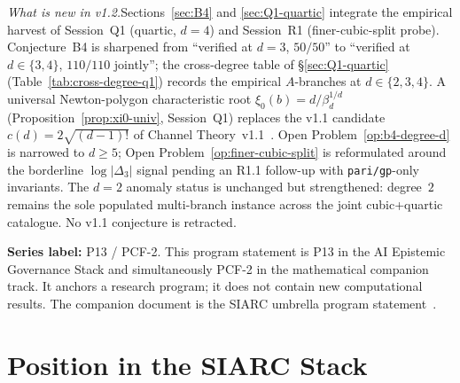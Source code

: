 \documentclass[11pt,a4paper]{article}
\theoremstyle{definition}
\theoremstyle{remark}
\begin{document}
\begin{abstract}
$A$ and motivating a ``$d=2$ anomaly'' open problem on why degree~$2$
admits an analogous $\mathrm{sgn}(\Delta)$-driven split $A\in\{3,4\}$
(Theorem~5 of PCF-1 v1.3) while degrees $3$ and $4$ do not. Companion
to Conjecture~B4 is a universal Newton-polygon characteristic root
$\xi_0(b)=d/\beta_d^{1/d}$ derived in Session~Q1 and verified at
$d=4$ to spread $0$ across $8$ representatives. A finer-cubic-split
probe (Session~R1) flags $\log|\Delta_3|$ as a candidate slow-trend
invariant correlated with the $A_{\mathrm{fit}}$ residual at
borderline significance (Spearman $\rho\in[-0.49,-0.45]$,
Bonferroni $p\in[3.7\times 10^{-3},\,1.1\times 10^{-2}]$); the HALT
threshold is not met and Conjecture~B4 is retained as stated.
\end{abstract}

\noindent\textit{What is new in v1.2.}\;\;Sections~\ref{sec:B4} and
\ref{sec:Q1-quartic} integrate the empirical harvest of
Session~Q1 (quartic, $d=4$) and Session~R1 (finer-cubic-split probe).
Conjecture~B4 is sharpened from ``verified at $d=3$, $50/50$'' to
``verified at $d\in\{3,4\}$, $110/110$ jointly''; the cross-degree
table of \S\ref{sec:Q1-quartic} (Table~\ref{tab:cross-degree-q1})
records the empirical $A$-branches at $d\in\{2,3,4\}$. A universal
Newton-polygon characteristic root $\xi_0(b)=d/\beta_d^{1/d}$
(Proposition~\ref{prop:xi0-univ}, Session~Q1) replaces the v1.1
candidate $c(d)=2\sqrt{(d-1)!}$ of Channel
Theory~v1.1~\cite{Papanokechi2026Channel}. Open
Problem~\ref{op:b4-degree-d} is narrowed to $d\ge 5$;
Open Problem~\ref{op:finer-cubic-split} is reformulated around the
borderline $\log|\Delta_3|$ signal pending an R1.1 follow-up with
\texttt{pari/gp}-only invariants. The $d=2$ anomaly status is
unchanged but strengthened: degree~$2$ remains the sole populated
multi-branch instance across the joint cubic+quartic catalogue. No
v1.1 conjecture is retracted.
\smallskip

\noindent\textbf{Series label:} P13 / PCF-2.\;
This program statement is P13 in the AI Epistemic Governance Stack and
simultaneously PCF-2 in the mathematical companion track. It anchors a
research program; it does not contain new computational results. The
companion document is the SIARC umbrella program
statement~\cite{Papanokechi2026UMB}.

\tableofcontents

\section{Position in the SIARC Stack}\label{sec:position}
\end{document}
